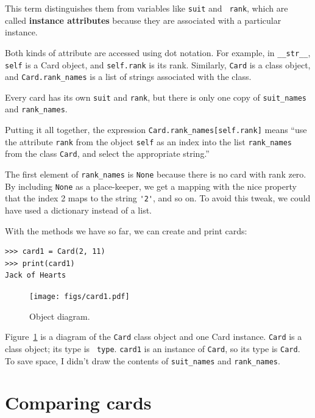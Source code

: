 \documentclass[10pt]{book}
\begin{document}
This term distinguishes them from variables like {\tt suit} and {\tt
  rank}, which are called {\bf instance attributes} because they are
associated with a particular instance.

Both kinds of attribute are accessed using dot notation.  For
example, in \verb"__str__", {\tt self} is a Card object,
and {\tt self.rank} is its rank.  Similarly, {\tt Card}
is a class object, and \verb"Card.rank_names" is a
list of strings associated with the class.

Every card has its own {\tt suit} and {\tt rank}, but there
is only one copy of \verb"suit_names" and \verb"rank_names".

Putting it all together, the expression
\verb"Card.rank_names[self.rank]" means ``use the attribute {\tt rank}
from the object {\tt self} as an index into the list \verb"rank_names"
from the class {\tt Card}, and select the appropriate string.''

The first element of \verb"rank_names" is {\tt None} because there
is no card with rank zero.  By including {\tt None} as a place-keeper,
we get a mapping with the nice property that the index 2 maps to the
string \verb"'2'", and so on.  To avoid this tweak, we could have
used a dictionary instead of a list.

With the methods we have so far, we can create and print cards:

\begin{verbatim}
>>> card1 = Card(2, 11)
>>> print(card1)
Jack of Hearts
\end{verbatim}

\begin{figure}
\centerline
{\texttt{[image: figs/card1.pdf]}}
\caption{Object diagram.}
\label{fig.card1}
\end{figure}

Figure~\ref{fig.card1} is a diagram of the {\tt Card} class object and
one Card instance.  {\tt Card} is a class object; its type is {\tt
  type}.  {\tt card1} is an instance of {\tt Card}, so its type is
{\tt Card}.  To save space, I didn't draw the contents of
\verb"suit_names" and \verb"rank_names".  
  


\section{Comparing cards}
\label{comparecard}
\end{document}
